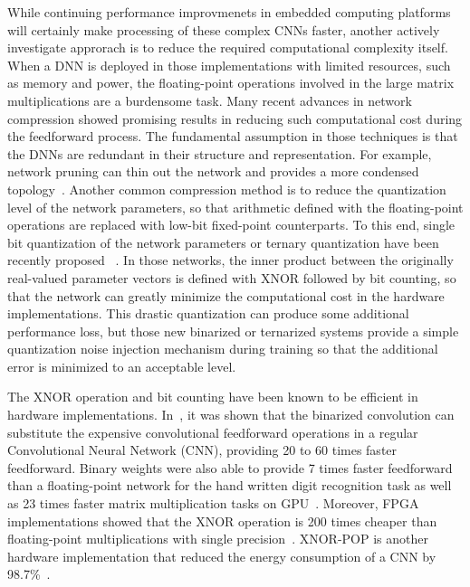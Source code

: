 While continuing performance improvmenets in embedded computing
platforms will certainly make processing of these complex CNNs faster,
another actively investigate approrach is to reduce the required
computational complexity itself.
When a DNN is deployed in those implementations with limited
resources, such as memory and power, the floating-point operations
involved in the large matrix multiplications are a burdensome task.
Many recent advances in network compression showed promising results
in reducing such computational cost during the feedforward
process. The fundamental assumption in those techniques is that the
DNNs are redundant in their structure and representation. For example,
network pruning can thin out the network and provides a more condensed
topology~\cite{han2015deep}.
Another common compression method is to reduce the
quantization level of the network parameters, so that arithmetic
defined with the floating-point operations are replaced with low-bit
fixed-point counterparts. To this end, single bit quantization of the
network parameters or ternary quantization have been recently proposed
~\cite{hwang2014fixed,soudry2014expectation,kim2016bitwise,rastegari2016xnor,hubara2016binarized,beauchamp2006embedded,govindu2004analysis}.
In those networks, the inner product between the
originally real-valued parameter vectors is defined with XNOR followed
by bit counting, so that the network can greatly minimize the
computational cost in the hardware implementations. This drastic
quantization can produce some additional performance loss, but those
new binarized or ternarized systems provide a simple quantization
noise injection mechanism during training so that the additional error
is minimized to an acceptable level.

The XNOR operation and bit counting have been known to be efficient in
hardware implementations. In~\cite{rastegari2016xnor}, it was shown
that the binarized convolution can substitute the expensive
convolutional feedforward operations in a regular Convolutional Neural
Network (CNN), %
providing 20 to 60 times faster feedforward. Binary weights were also
able to provide 7 times faster feedforward than a floating-point
network for the hand written digit recognition task as well as 23
times faster matrix multiplication tasks on
GPU~\cite{hubara2016binarized}.
Moreover, FPGA implementations showed that the XNOR operation is 200
times cheaper than floating-point multiplications with 
single precision~\cite{beauchamp2006embedded,govindu2004analysis}.
XNOR-POP is another hardware implementation that reduced
the energy consumption of a CNN by 98.7\%~\cite{jiang2017xnor}.

